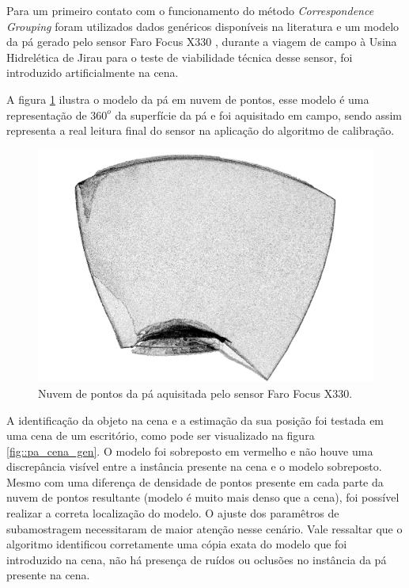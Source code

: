 Para um primeiro contato com o funcionamento do método \textit{Correspondence
Grouping} foram utilizados dados genéricos disponíveis na literatura
\footnotemark {}
e um modelo da pá gerado pelo sensor Faro Focus X330 , durante a viagem de campo
à Usina Hidrelética de Jirau para o teste de viabilidade técnica desse sensor, foi
introduzido artificialmente na cena.

A figura \ref{fig::modelo_pa_faro} ilustra o modelo da pá em nuvem de pontos,
esse modelo é uma representação de $360^o$ da superfície da pá e foi aquisitado em
campo, sendo assim representa a real leitura final do sensor na aplicação do
algoritmo de calibração.

\begin{figure}[h!]
	\centering
	\includegraphics[width=0.9\columnwidth]{figs/calibracao/modelo_pa_faro}
	\caption{Nuvem de pontos da pá aquisitada pelo sensor Faro Focus X330.}
    \label{fig::modelo_pa_faro}
\end{figure}

A identificação da objeto na cena e a estimação da sua posição foi testada em
uma cena de um escritório, como pode ser visualizado na figura
\ref{fig::pa_cena_gen}. O modelo foi sobreposto em vermelho e não houve uma
discrepância visível entre a instância presente na cena e o modelo sobreposto. 
Mesmo com uma diferença de densidade de pontos presente em cada parte da nuvem
de pontos resultante (modelo é muito mais denso que a cena), foi possível
realizar a correta localização do modelo. O ajuste dos paramêtros de
subamostragem necessitaram de maior atenção nesse cenário. Vale ressaltar que o
algoritmo identificou corretamente uma cópia exata do modelo que foi introduzido
na cena, não há presença de ruídos ou oclusões no instância da pá presente na
cena.

